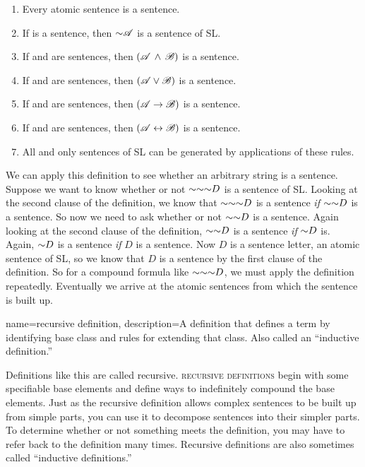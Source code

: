 \begin{enumerate}
\item Every atomic sentence is a sentence.
\item If  is a sentence, then $\mathord{\sim}\mathscr{A}$ is a sentence of SL.
\item If  and  are sentences, then $(\mathscr{A}\,\land\,\mathscr{B})$ is a sentence.
\item If  and  are sentences, then $(\mathscr{A}\lor\mathscr{B})$ is a sentence.
\item If  and  are sentences, then $(\mathscr{A}\rightarrow\mathscr{B})$ is a sentence.
\item If  and  are sentences, then $(\mathscr{A}\leftrightarrow\mathscr{B})$ is a sentence.
\item All and only sentences of SL can be generated by applications of these rules.
\end{enumerate}

We can apply this definition to see whether an arbitrary string is a sentence. Suppose we want to know whether or not $\mathord{\sim} \mathord{\sim} \mathord{\sim} D$ is a sentence of SL. Looking at the second clause of the definition, we know that $\mathord{\sim} \mathord{\sim} \mathord{\sim} D$ is a sentence \emph{if} $\mathord{\sim} \mathord{\sim} D$ is a sentence. So now we need to ask whether or not $\mathord{\sim} \mathord{\sim} D$ is a sentence. Again looking at the second clause of the definition, $\mathord{\sim} \mathord{\sim} D$ is a sentence \emph{if} $\mathord{\sim} D$ is. Again, $\mathord{\sim} D$ is a sentence \emph{if} $D$ is a sentence. Now $D$ is a sentence letter, an atomic sentence of SL, so we know that $D$ is a sentence by the first clause of the definition. So for a compound formula like $\mathord{\sim} \mathord{\sim} \mathord{\sim} D$, we must apply the definition repeatedly. Eventually we arrive at the atomic sentences from which the sentence is built up.

{
name=recursive definition,
description={A definition that defines a term by identifying base class and rules for extending that class. Also called an ``inductive definition.''}
}

Definitions like this are called recursive. \textsc{\Glspl{recursive definition}}\label{def:recursive_definition} begin with some specifiable base elements and define ways to indefinitely compound the base elements. Just as the recursive definition allows complex sentences to be built up from simple parts, you can use it to decompose sentences into their simpler parts. To determine whether or not something meets the definition, you may have to refer back to the definition many times. Recursive definitions are also sometimes called ``inductive definitions.''

